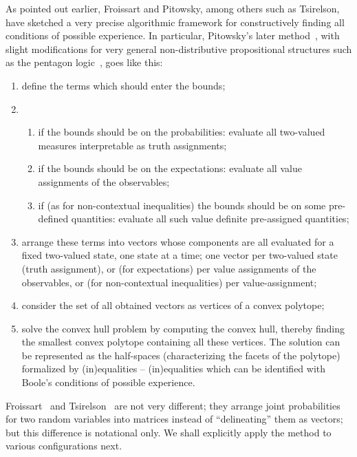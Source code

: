 As pointed out earlier, Froissart and  Pitowsky, among others such as  Tsirelson, have
sketched a very precise algorithmic framework for constructively finding all conditions of possible experience.
In particular,
Pitowsky's later method~\cite{pitowsky,pitowsky-89a,Pit-91,Pit-94,2000-poly},
with slight modifications for very general non-distributive propositional structures
such as the pentagon logic~\cite{svozil-2001-eua,svozil-2008-ql,svozil-2016-s}, goes like this:
\begin{enumerate}
\item
define the terms which should enter the bounds;


\item
\begin{enumerate}
\item
if the bounds should be on the probabilities: evaluate all two-valued measures interpretable as truth assignments;

\item
if the bounds should be on the expectations: evaluate all value assignments of the observables;

\item
if (as for non-contextual inequalities) the bounds should be on some pre-defined quantities: evaluate all such value definite pre-assigned quantities;
\end{enumerate}

\item
arrange these terms into vectors whose components are all evaluated for a fixed two-valued state, one state at a time;
one vector per two-valued state (truth assignment), or (for expectations)
per value assignments of the observables, or (for non-contextual inequalities) per value-assignment;

\item
consider the set of all obtained vectors as vertices of a convex polytope;

\item
solve the convex hull problem  by computing the convex hull, thereby
finding the smallest convex polytope containing all these vertices.
The solution can be represented as
the half-spaces (characterizing the facets of the polytope) formalized by (in)equalities --
(in)equalities which can be identified with  Boole's conditions of possible experience.


\end{enumerate}

Froissart~\cite{froissart-81} and Tsirelson~\cite{cirelson} are not very different;
they arrange joint probabilities for two random variables into matrices instead of ``delineating'' them as vectors;
but this difference is notational only. We shall explicitly apply the method to various configurations next.

